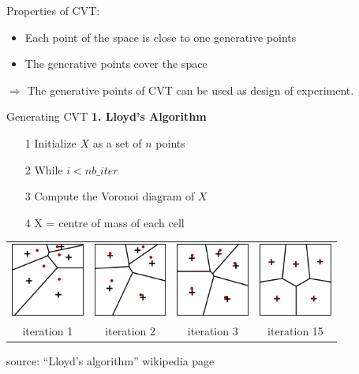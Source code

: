\documentclass{beamer}
\begin{document}
\begin{frame}{}

Properties of CVT:
\begin{itemize}
	\item Each point of the space is close to one generative points
	\item The generative points cover the space
\end{itemize}
$\Rightarrow$ The generative points of CVT can be used as design of experiment.
\end{frame}

\begin{frame}{Generating CVT }
\textbf{1. Lloyd's Algorithm}
\begin{itemize}
	\item[1] Initialize $X$ as a set of $n$ points
	\item[2] While $i<nb\_iter$
	\item[3] \qquad Compute the Voronoi diagram of $X$
	\item[4] \qquad X = centre of mass of each cell
\end{itemize}
\begin{center}
  \begin{tabular}{cccc}
\includegraphics[height=2.4cm]{figures/Lloyds1}&
\includegraphics[height=2.4cm]{figures/Lloyds2}&
\includegraphics[height=2.4cm]{figures/Lloyds3}&
\includegraphics[height=2.4cm]{figures/Lloyds15}\\
iteration 1 & iteration 2 &iteration 3 &iteration 15
  \end{tabular}
\end{center}
source: ``Lloyd's algorithm'' wikipedia page
\end{frame}
\end{document}
